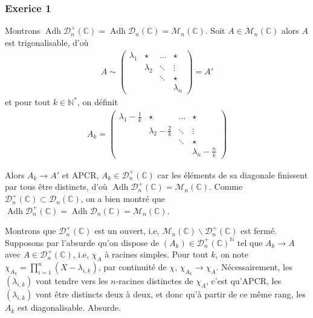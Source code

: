 \documentclass{article}
\DeclareMathOperator{\adh}{Adh}
\begin{document}
	\subsubsection*{Exerice 1}
	Montrons $\adh \mathcal{D}_n^+(\mathbb{C}) = \adh \mathcal{D}_n(\mathbb{C}) = \mathcal{M}_n(\mathbb{C})$. Soit $A\in\mathcal{M}_n(\mathbb{C})$ alors $A$ est trigonalisable, d'où 
	\begin{align*}
		A \sim \begin{pmatrix}   
  \lambda_1 & \star & \ldots & \star\\
	    & \lambda_2 & \ddots&\vdots\\
	    &&\ddots & \star \\
	    & & & \lambda_n
		\end{pmatrix} = A'
	\end{align*}
	et pour tout $k\in \mathbb{N}^*$, on définit 
	\begin{align*}
		A_k = \begin{pmatrix}
			\lambda_1-\frac{1}{k} & \star & \ldots & \star\\
					      & \lambda_2-\frac{2}{k} & \ddots & \vdots\\
					      &&\ddots & \star \\
					      & & & \lambda_n-\frac{n}{k}
		\end{pmatrix}
	\end{align*}

	Alors $A_k\to A'$ et APCR, $A_k \in\mathcal{D}_n^+(\mathbb{C})$ car les éléments de sa diagonale finissent par tous être distincts, d'où $\adh \mathcal{D}_n^+(\mathbb{C})=\mathcal{M}_n(\mathbb{C})$. Comme $\mathcal{D}_n^+(\mathbb{C})\subset \mathcal{D}_n(\mathbb{C})$, on a bien montré que $\adh \mathcal{D}_n^+(\mathbb{C}) = \adh \mathcal{D}_n(\mathbb{C}) = \mathcal{M}_n(\mathbb{C})$. 

	Montrons que $\mathcal{D}_n^+(\mathbb{C})$ est un ouvert, i.e, $\mathcal{M}_n(\mathbb{C})\backslash\mathcal{D}_n^+(\mathbb{C})$ est fermé. Supposons par l'absurde qu'on dispose de $(A_k)\in\mathcal{D}_n^+(\mathbb{C})^\mathbb{N}$ tel que $A_k\to A$ avec $A\in\mathcal{D}_n^+(\mathbb{C})$, i.e, $\chi_A$ à racines simples. Pour tout $k$, on note $\chi_{A_k} = \prod_{i=1}^n (X-\lambda_{i,k})$, par continuité de $\chi$, $\chi_{A_k}\to \chi_A$. Nécessairement, les $(\lambda_{i,k})$ vont tendre vers les $n$-racines distinctes de $\chi_A$, c'est qu'APCR, les $(\lambda_{i,k})$ vont être distincts deux à deux, et donc qu'à partir de ce même rang, les $A_k$ est diagonalisable. Absurde.  
\end{document}
